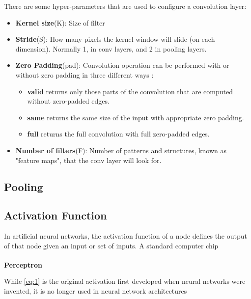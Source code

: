 There are some hyper-parameters that are used to configure a convolution layer:
\begin{itemize}
    \item \textbf{Kernel size}(K): Size of filter 
    \item \textbf{Stride}(S): How many pixels the kernel window will slide (on each dimension). Normally 1, in conv layers, and 2 in pooling layers.
    \item \textbf{Zero Padding}(pad): Convolution operation can be performed with or without zero padding in three different ways :
    \begin{itemize}
    
    \item \textbf{valid} returns only those parts of the convolution that are computed without zero-padded edges.
    \item \textbf{same} returns the same size of the input with appropriate zero padding.
    \item \textbf{full} returns the full convolution with full zero-padded edges.
    
     \end{itemize}
    \item \textbf{Number of filters}(F): Number of patterns and structures, known as "feature maps", that the conv layer will look for.
 \end{itemize}
 
\subsection{Pooling}



\subsection{Activation Function}
In artificial neural networks, the activation function of a node defines the output of that node given an input or set of inputs. A standard computer chip 
\\
\\
\textbf{Perceptron}


While  \ref{eq:1} is the original activation first developed when neural networks were invented, it is no longer used in neural network architectures 
